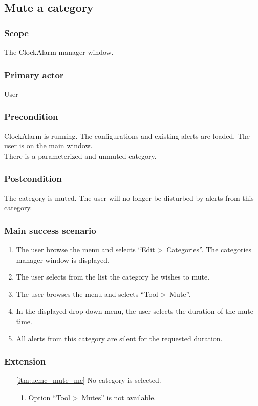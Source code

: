 \subsection{Mute a category}

\subsubsection{Scope}
The ClockAlarm manager window.
\subsubsection{Primary actor}
User
\subsubsection{Precondition}
ClockAlarm is running. The configurations and existing alerts are loaded. The user is on the main window.
\\There is a parameterized and unmuted category.
\subsubsection{Postcondition}
The category is muted. The user will no longer be disturbed by alerts from this category.
\subsubsection{Main success scenario}
\begin{enumerate}
	\item The user browse the menu and selects ``Edit \textgreater~Categories''. The categories manager window is displayed. 
	\item The user selects from the list the category he wishes to mute.
	\item \label{itm:ucmc_mute_mc}The user browses the menu and selects ``Tool \textgreater~Mute''.
	\item In the displayed drop-down menu, the user selects the duration of the mute time.
	\item All alerts from this category are silent for the requested duration.
\end{enumerate}
\subsubsection{Extension}
\begin{enumerate}
	\item[\ref{itm:ucmc_mute_mc}] No category is selected.
	\begin{enumerate}[i]
		\item Option ``Tool \textgreater~Mutes'' is not available.
	\end{enumerate}
\end{enumerate}

